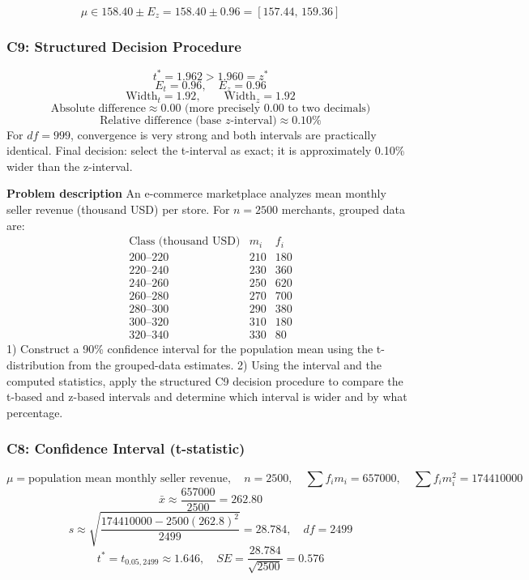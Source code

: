 \begin{ExamProblems}
		\[
		\mu\in 158.40\pm E_z=158.40\pm 0.96=[157.44,\,159.36]
		\]

		\subsubsection*{C9: Structured Decision Procedure}
		\[
		t^*=1.962>1.960=z^*
		\]
		\[
		E_t=0.96,\quad E_z=0.96
		\]
		\[
		\text{Width}_t=1.92,\qquad \text{Width}_z=1.92
		\]
		\[
		\text{Absolute difference}\approx 0.00\text{ (more precisely }0.00\text{ to two decimals)}
		\]
		\[
		\text{Relative difference (base }z\text{-interval)}\approx 0.10\%
		\]
		For $df=999$, convergence is very strong and both intervals are practically identical.
		Final decision: select the t-interval as exact; it is approximately 0.10\% wider than the z-interval.

		\newpage
		\item
		\textbf{Problem description}
		An e-commerce marketplace analyzes mean monthly seller revenue (thousand USD) per store.
		For $n=2500$ merchants, grouped data are:
		\[
		\begin{array}{c|c|c}
		\text{Class (thousand USD)} & m_i & f_i\\\hline
		200\text{--}220 & 210 & 180\\
		220\text{--}240 & 230 & 360\\
		240\text{--}260 & 250 & 620\\
		260\text{--}280 & 270 & 700\\
		280\text{--}300 & 290 & 380\\
		300\text{--}320 & 310 & 180\\
		320\text{--}340 & 330 & 80
		\end{array}
		\]
		1) Construct a 90\% confidence interval for the population mean using the t-distribution from the grouped-data estimates.
		2) Using the interval and the computed statistics, apply the structured C9 decision procedure to compare the t-based and z-based intervals and determine which interval is wider and by what percentage.

		\subsubsection*{C8: Confidence Interval (t-statistic)}
		\[
		\mu=\text{population mean monthly seller revenue},\quad n=2500,\quad \sum f_im_i=657000,\quad \sum f_im_i^2=174410000
		\]
		\[
		\bar{x}\approx\frac{657000}{2500}=262.80
		\]
		\[
		s\approx\sqrt{\frac{174410000-2500(262.8)^2}{2499}}=28.784,\quad df=2499
		\]
		\[
		t^*=t_{0.05,2499}\approx 1.646,\quad SE=\frac{28.784}{\sqrt{2500}}=0.576
		\]


\end{ExamProblems}
